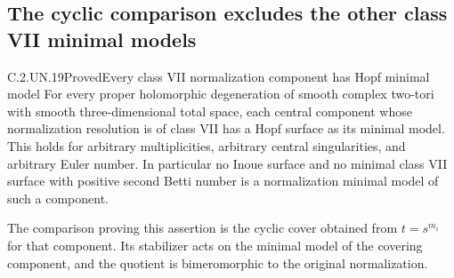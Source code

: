 \subsection{The cyclic comparison excludes the other class VII minimal models}

\begin{statement}{C.2.UN.19}{Proved}{Every class VII normalization component has Hopf minimal model}
For every proper holomorphic degeneration of smooth complex
two-tori with smooth three-dimensional total space, each
central component whose normalization resolution is of class
VII has a Hopf surface as its minimal model. This holds for
arbitrary multiplicities, arbitrary central singularities,
and arbitrary Euler number. In particular no Inoue surface
and no minimal class VII surface with positive second Betti
number is a normalization minimal model of such a component.

The comparison proving this assertion is the cyclic cover
obtained from $t=s^{m_i}$ for that component. Its stabilizer
acts on the minimal model of the covering component, and
the quotient is bimeromorphic to the original normalization.
\end{statement}

